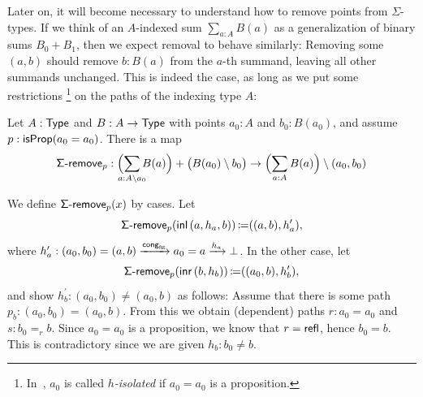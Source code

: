 Later on, it will become necessary to understand how to remove points from \( \Sigma \)-types.
If we think of an \( A \)-indexed sum \( \sum_{a : A} B(a) \) as a generalization of binary sums \( B_0 + B_1 \),
then we expect removal to behave similarly:
Removing some \( (a, b) \) should remove \( b : B(a) \) from the \( a \)-th
summand, leaving all other summands unchanged.
This is indeed the case, as long as we put some restrictions%
\footnote{In~\cite[\href{https://www.cs.bham.ac.uk/~mhe/TypeTopology/UF.Sets.html\#is-h-isolated}{UF.Sets}]{EscardocontributorsTypeTopology}, \( a_0 \) is called \emph{\( h \)-isolated} if \( a_0 = a_0 \) is a proposition.}
on the paths of the indexing type \( A \):
\begin{problem}\label{sigma-remove}
  Let \( A : \operatorname{\mathsf{Type}} \) and \( B : A \to \operatorname{\mathsf{Type}} \)
  with points \( a_0 : A \) and \( b_0 : B(a_0) \),
  and assume \( p : \mathsf{isProp}(a_0 = a_0) \).
  There is a map
  \[
    \operatorname{\Op{\Sigma-remove}}_p :
    \Bigl(\smashoperator{\sum_{a : A \setminus a_0}} B(a)\Bigr) + \bigl(B(a_0) \setminus b_0\bigr)
      \to
    \Bigl(\sum_{a : A} B(a) \Bigr) \setminus (a_0 , b_0)
  \]
  \begin{construction}
    We define \( \operatorname{\mathsf{\Sigma-remove}}_p(x) \) by cases.
    Let
    \[
      \operatorname{\mathsf{\Sigma-remove}}_p(\operatorname{\mathsf{inl}}{(a, h_a, b)}) \operatorname{\mathrel{\coloneq}} ((a, b) , h^\prime_a),
    \]
    where \( h^\prime_a : (a_0 , b_0) = (a, b) \xrightarrow{\mathsf{cong}_{\mathsf{fst}}} a_0 = a \xrightarrow{h_a} \bot \).
    In the other case, let
    \[
      \operatorname{\mathsf{\Sigma-remove}}_p(\operatorname{\mathsf{inr}}{(b, h_b)}) \operatorname{\mathrel{\coloneq}} ((a_0, b) , h^\prime_b),
    \]
    and show \( h^\prime_b : (a_0 , b_0) \neq (a_0 , b) \) as follows:
    Assume that there is some path \( p_b : (a_0 , b_0) = (a_0 , b) \).
    From this we obtain (dependent) paths \( r : a_0 = a_0 \) and \( s : b_0 =_r b \).
    Since \( a_0 = a_0 \) is a proposition, we know that \( r = \mathsf{refl} \),
    hence \( b_0 = b \).
    This is contradictory since we are given \( h_b : b_0 \neq b \).
  \end{construction}
\end{problem}

